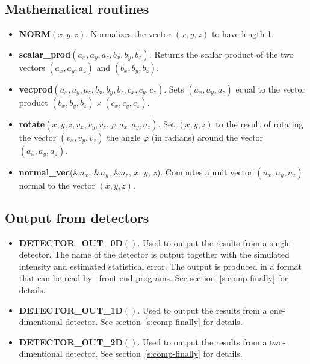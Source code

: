 \subsection{Mathematical routines}
\begin{itemize}
\item {\bf NORM}$(x,y,z)$. Normalizes the vector $(x,y,z)$ to have
  length 1.
\item {\bf scalar\_prod}$(a_x,a_y,a_z,b_x,b_y,b_z)$. Returns the scalar
  product of the two vectors $(a_x,a_y,a_z)$ and $(b_x,b_y,b_z)$.
\item {\bf vecprod}$(a_x,a_y,a_z,b_x,b_y,b_z, c_x,c_y,c_z)$. Sets
  $(a_x,a_y,a_z)$ equal to the vector product $(b_x,b_y,b_z) \times (c_x,c_y,c_z)$.
\item {\bf rotate}$(x,y,z,v_x,v_y,v_z,\varphi,a_x,a_y,a_z)$. Set
  $(x,y,z)$ to the result of rotating the vector $(v_x,v_y,v_z)$
  the angle $\varphi$ (in radians) around the vector $(a_x,a_y,a_z)$.
\item {\bf normal\_vec}(\&$n_x$, \&$n_y$, \&$n_z$, $x$, $y$, $z$).
  Computes a unit vector $(n_x, n_y, n_z)$ normal to the vector
  $(x,y,z)$.
\end{itemize}

\subsection{Output from detectors}
\begin{itemize}
\item {\bf DETECTOR\_OUT\_0D}$()$. Used to output the results from a
  single detector. The name of the detector is output together
  with the simulated intensity and estimated statistical error. The
  output is produced in a format that can be read by \MCS\ front-end
  programs. See section~\ref{s:comp-finally} for details.
\item {\bf DETECTOR\_OUT\_1D}$()$. Used to output the results from a
  one-dimentional detector. See section~\ref{s:comp-finally} for details.
\item {\bf DETECTOR\_OUT\_2D}$()$. Used to output the results from a
  two-dimentional detector. See section~\ref{s:comp-finally} for details.
\end{itemize}

